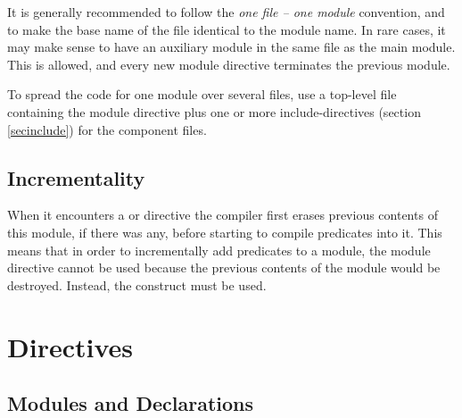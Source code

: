 It is generally recommended to follow the \emph{one file -- one module}
convention, and to make the base name of the file identical to the
module name.  In rare cases, it may make sense to have an auxiliary
module in the same file as the main module.  This is allowed, and
every new module directive terminates the previous module.

To spread the code for one module over several files, use a top-level
file containing the module directive plus one or more include-directives
(section \ref{secinclude}) for the component files.


\subsection{Incrementality}

When it encounters a
 or
 directive
the compiler first erases previous contents of this module,
if there was any, before starting to compile predicates
into it.  This means that in order to incrementally add predicates
to a module, the module directive cannot be used
because the previous contents of the module would be destroyed.
Instead, the construct  must be used.




\section{Directives}

\subsection{Modules and Declarations}

